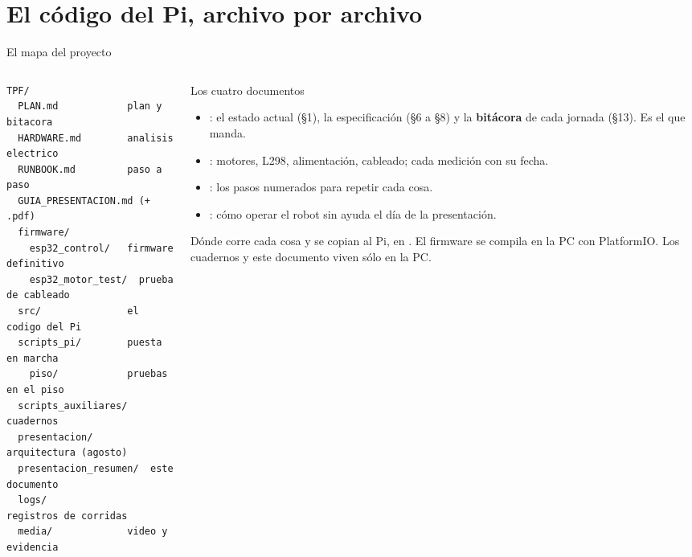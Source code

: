 \section{El código del Pi, archivo por archivo}

\begin{frame}[fragile]{El mapa del proyecto}
\begin{columns}[T,onlytextwidth]
\begin{column}{0.47\textwidth}
\scriptsize
\begin{verbatim}
TPF/
  PLAN.md            plan y bitacora
  HARDWARE.md        analisis electrico
  RUNBOOK.md         paso a paso
  GUIA_PRESENTACION.md (+ .pdf)
  firmware/
    esp32_control/   firmware definitivo
    esp32_motor_test/  prueba de cableado
  src/               el codigo del Pi
  scripts_pi/        puesta en marcha
    piso/            pruebas en el piso
  scripts_auxiliares/  cuadernos
  presentacion/      arquitectura (agosto)
  presentacion_resumen/  este documento
  logs/              registros de corridas
  media/             video y evidencia
\end{verbatim}
\end{column}
\begin{column}{0.51\textwidth}
\footnotesize
\begin{block}{Los cuatro documentos}
  \begin{itemize}
    \item {}: el estado actual (§1), la especificación (§6 a §8) y
          la \textbf{bitácora} de cada jornada (§13). Es el que manda.
    \item {}: motores, L298, alimentación, cableado; cada
          medición con su fecha.
    \item {}: los pasos numerados para repetir cada cosa.
    \item {}: cómo operar el robot sin ayuda el día de
          la presentación.
  \end{itemize}
\end{block}
\begin{block}{Dónde corre cada cosa}
   y  se copian al Pi, en . El
  firmware se compila en la PC con PlatformIO. Los cuadernos y este documento
  viven sólo en la PC.
\end{block}
\end{column}
\end{columns}
\end{frame}

